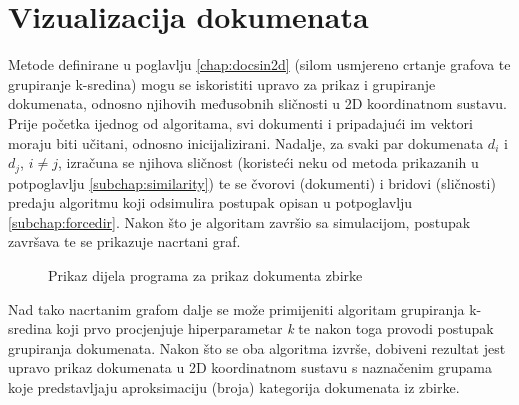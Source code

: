 \documentclass[times, utf8, zavrsni]{fer}
\begin{document}
\section{Vizualizacija dokumenata}
\label{sec:docdisplay}
Metode definirane u poglavlju \ref{chap:docsin2d} (silom usmjereno crtanje grafova te grupiranje k-sredina) mogu se iskoristiti upravo za prikaz i grupiranje dokumenata, odnosno njihovih međusobnih sličnosti u 2D koordinatnom sustavu. Prije početka ijednog od algoritama, svi dokumenti i pripadajući im vektori moraju biti učitani, odnosno inicijalizirani. Nadalje, za svaki par dokumenata $d_{i}$ i $d_{j}$, $i \neq j$, izračuna se njihova sličnost (koristeći neku od metoda prikazanih u potpoglavlju \ref{subchap:similarity}) te se čvorovi (dokumenti) i bridovi (sličnosti) predaju algoritmu koji odsimulira postupak opisan u potpoglavlju \ref{subchap:forcedir}. Nakon što je algoritam završio sa simulacijom, postupak završava te se prikazuje nacrtani graf.
\begin{figure}
\caption{Prikaz dijela programa za prikaz dokumenta zbirke}
\label{img:graph_program}
\end{figure}
Nad tako nacrtanim grafom dalje se može primijeniti algoritam grupiranja k-sredina koji prvo procjenjuje hiperparametar \textit{k} te nakon toga provodi postupak grupiranja dokumenata. Nakon što se oba algoritma izvrše, dobiveni rezultat jest upravo prikaz dokumenata u 2D koordinatnom sustavu s naznačenim grupama koje predstavljaju aproksimaciju (broja) kategorija dokumenata iz zbirke. \par
\end{document}
